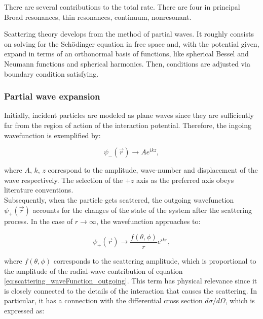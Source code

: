 \documentclass[openany]{book}
\begin{document}
 
There are several contributions  to the total rate. There are four in principal 
Broad resonances, thin resonances, continuum, nonresonant.

Scattering theory develops from the method of partial waves. It roughly consists on solving for the Schödinger equation in free space and, with the potential given, expand in terms of an orthonormal basis of functions, like spherical Bessel and Neumann functions and spherical harmonics. Then, conditions are adjusted via boundary condition satisfying. \\

\subsubsection{Partial wave expansion}

Initially, incident particles are modeled as plane waves since they are sufficiently far from the region of action of the interaction potential. Therefore, the ingoing wavefunction is exemplified by: 

\begin{equation} \label{eq:scattering_waveFunction_incident}
	\psi_{-}(\vec r) \rightarrow A e^{ikz}, 
\end{equation}

where $A$, $k$, $z$ correspond to the amplitude, wave-number and displacement of the wave respectively. The selection of the $+z$ axis as the preferred axis obeys literature conventions. \\

Subsequently, when the particle gets scattered, the outgoing wavefunction $\psi_{+}(\vec r)$ accounts for the changes of the state of the system after the scattering process. In the case of $r \rightarrow \infty$, the wavefunction approaches to:

\begin{equation} \label{eq:scattering_waveFunction_outgoing}
	\psi_{+}(\vec r) \rightarrow \frac{f(\theta, \phi)}{r} e^{i k r}, 
\end{equation}

where $f(\theta, \phi)$ corresponds to the scattering amplitude, which is proportional to the amplitude of the radial-wave contribution of equation \ref{eq:scattering_waveFunction_outgoing}. This term has physical relevance since it is closely connected to the details of the interaction that causes the scattering. In particular, it has a connection with the differential cross section $d\sigma / d\Omega$, which is expressed as: 
\end{document}
